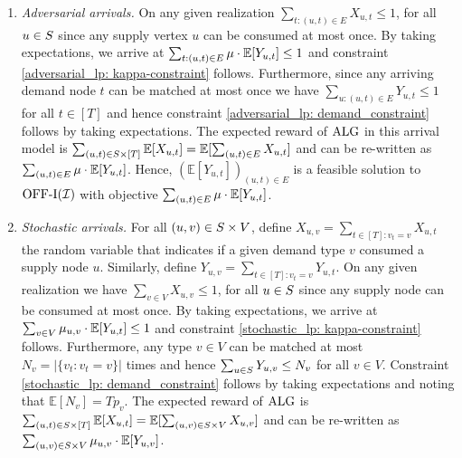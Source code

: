    \begin{enumerate}
       \item \textit{Adversarial arrivals.}  On any given realization $\sum_{t: (u,t) \in E}  X_{u,t} \leq 1$, for all $u \in S$ since any supply vertex $u$ can be consumed at most once. By taking expectations, we arrive at $\sum_{t: (u,t) \in E}  \mu \cdot \mathbb E[Y_{u,t}] \leq 1$ and constraint \eqref{adversarial_lp: kappa-constraint} follows. Furthermore, since any arriving demand node $t$ can be matched at most once we have $\sum_{u: (u,t) \in E} Y_{u,t} \leq 1$ for all $t \in [T]$ and hence constraint \eqref{adversarial_lp: demand_constraint} follows by taking expectations. The expected reward of $\mathrm{ALG}$ in this arrival model is $\sum_{(u,t) \in S \times [T]}  \mathbb E[X_{u,t}] = \mathbb E[\sum_{(u,t) \in E}  X_{u,t}]$ and can be re-written as $\sum_{(u,t) \in E} \mu \cdot \mathbb E[Y_{u,t}]$. Hence, $(\mathbb E[Y_{u,t}])_{(u,t) \in E}$ is a feasible solution to $\mathrm{\mathrm{OFF}}\textrm{-}\mathrm{I}(\mathcal I)$ with objective $\sum_{(u,t) \in E} \mu \cdot \mathbb E[Y_{u,t}]$.

       \item \textit{Stochastic arrivals.} For all $(u,v) \in S \times V$, define $X_{u,v} = \sum_{t \in [T]: v_t = v} X_{u,t}$ the random variable that indicates if a given demand type $v$ consumed a supply node $u$. Similarly, define $Y_{u,v} = \sum_{t \in [T]: v_t = v} Y_{u,t}$. On any given realization we have $\sum_{v \in V}  X_{u,v} \leq 1$, for all $u \in S$ since any supply node can be consumed at most once. By taking expectations, we arrive at $\sum_{v \in V}  \mu_{u,v} \cdot \mathbb E[Y_{u,t}] \leq 1$ and constraint \eqref{stochastic_lp: kappa-constraint} follows. Furthermore, any type $v \in V$ can be matched at most $N_v = |\{ v_{t} : v_t = v\}|$ times and hence $\sum_{u \in S} Y_{u,v} \leq N_v$ for all $v \in V$. Constraint \eqref{stochastic_lp: demand_constraint} follows by taking expectations and noting that $\mathbb E[N_v] = T p_v$. The expected reward of $\mathrm{ALG}$ is $\sum_{(u,t) \in S \times [T]}  \mathbb E[X_{u,t}] = \mathbb E[\sum_{(u,v) \in S \times V}  X_{u,v}]$ and can be re-written as $\sum_{(u,v) \in S \times V} \mu_{u,v} \cdot \mathbb E[Y_{u,v}]$.
   \end{enumerate}
\hfill \Halmos


